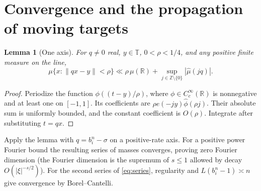 \documentclass[11pt,a4paper,reqno]{amsart}
\newtheorem{lemma}[theorem]{Lemma}
\theoremstyle{definition}
\theoremstyle{remark}
\numberwithin{equation}{section}
\begin{document}
\section{Convergence and the propagation of moving targets}\label{sec:upper}
\begin{lemma}[One axis]\label{lem:axis}
For \(q\ne0\) real, \(y\in\mathbb T\), \(0<\rho<1/4\), and any
positive finite measure on the line,
\[
 \mu\{x:\|qx-y\|<\rho\}
 \ll \rho\,\mu(\mathbb R)+\sup_{j\in\mathbb Z\setminus\{0\}}
                                      |\widehat\mu(jq)|.
\]
\end{lemma}
\begin{proof}
Periodize the function \(\phi((t-y)/\rho)\), where
\(\phi\in C_c^\infty(\mathbb R)\) is nonnegative and at least one
on \([-1,1]\). Its coefficients are
\(\rho e(-jy)\widehat\phi(\rho j)\). Their absolute sum is uniformly
bounded, and the constant coefficient is \(O(\rho)\). Integrate
after substituting \(t=qx\).
\end{proof}
Apply the lemma with \(q=b_i^n-\sigma\) on a positive-rate axis.
For a positive power Fourier bound the resulting series of masses
converges, proving zero Fourier dimension (the Fourier dimension is
the supremum of \(s\le1\) allowed by decay \(O(|\xi|^{-s/2})\)).
For the second series of \eqref{eq:series}, regularity and
\(L(b_i^n-1)\asymp n\) give convergence by Borel--Cantelli.
\end{document}
